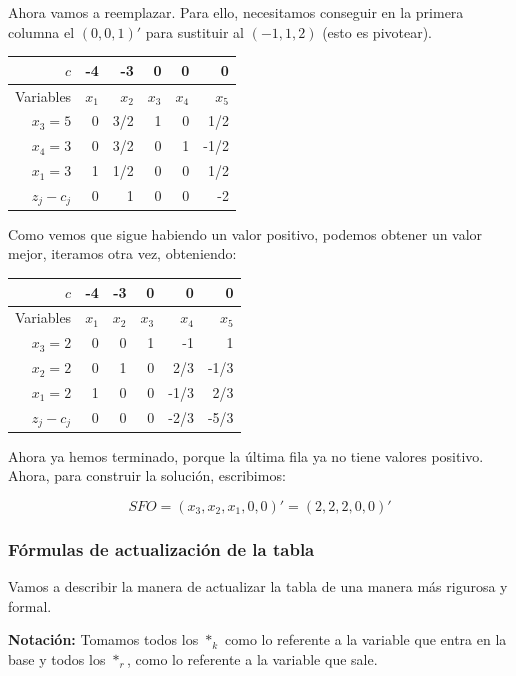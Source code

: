 \begin{example}
Ahora vamos a reemplazar. Para ello, necesitamos conseguir en la primera columna el $(0,0,1)'$ para sustituir al $(-1,1,2)$ (esto es pivotear).

\begin{table}
\centering
\begin{tabular}{r | rrrrr}
$c$ & -4 & -3 & 0 & 0 & 0 \\ \hline
Variables & $x_1$ & $x_2$ & $x_3$ & $x_4$ & $x_5$ \\ \hline
$x_3=5$ & 0 & 3/2 & 1 & 0 & 1/2 \\
$x_4=3$   & 0 & 3/2 & 0 & 1 & -1/2  \\
$x_1=3$ & 1 & 1/2 & 0 & 0 & 1/2 \\ \hline
$z_j-c_j$ &  0 & 1 & 0 & 0 & -2 
\end{tabular}
\end{table}

Como vemos que sigue habiendo un valor positivo, podemos obtener un valor mejor, iteramos otra vez, obteniendo:

\begin{table}
\centering
\begin{tabular}{r | rrrrr}
$c$ & -4 & -3 & 0 & 0 & 0 \\ \hline
Variables & $x_1$ & $x_2$ & $x_3$ & $x_4$ & $x_5$ \\ \hline
$x_3=2$ & 0 & 0 & 1 & -1 & 1 \\
$x_2=2$   & 0 & 1 & 0 & 2/3 & -1/3  \\
$x_1=2$ & 1 & 0 & 0 & -1/3 & 2/3 \\ \hline
$z_j-c_j$ &  0 & 0 & 0 & -2/3 & -5/3 
\end{tabular}
\end{table}

Ahora ya hemos terminado, porque la última fila ya no tiene valores positivo. Ahora, para construir la solución, escribimos:

\[SFO = (x_3,x_2,x_1,0,0)' = (2,2,2,0,0)'\]

\end{example}

\subsubsection{Fórmulas de actualización de la tabla}

Vamos a describir la manera de actualizar la tabla de una manera más rigurosa y formal. 

\textbf{Notación:} Tomamos todos los $*_k$ como lo referente a la variable que entra en la base y todos los $*_r$, como lo referente a la variable que sale.



